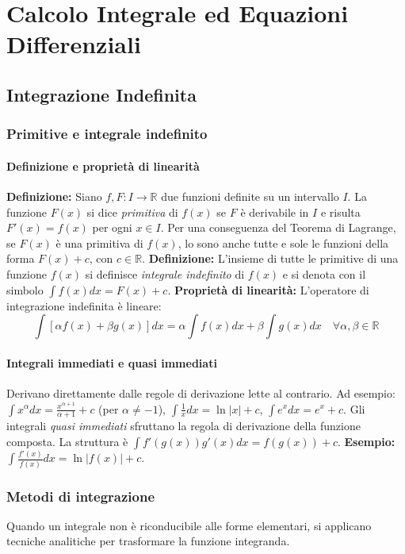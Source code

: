 \chapter{Calcolo Integrale ed Equazioni Differenziali}

\section{Integrazione Indefinita}
\subsection{Primitive e integrale indefinito}
\subsubsection{Definizione e proprietà di linearità}
\textbf{Definizione:} Siano $f, F: I \to \mathbb{R}$ due funzioni definite su un intervallo $I$. La funzione $F(x)$ si dice \textit{primitiva} di $f(x)$ se $F$ è derivabile in $I$ e risulta $F'(x) = f(x)$ per ogni $x \in I$.
Per una conseguenza del Teorema di Lagrange, se $F(x)$ è una primitiva di $f(x)$, lo sono anche tutte e sole le funzioni della forma $F(x) + c$, con $c \in \mathbb{R}$.
\textbf{Definizione:} L'insieme di tutte le primitive di una funzione $f(x)$ si definisce \textit{integrale indefinito} di $f(x)$ e si denota con il simbolo $\int f(x) dx = F(x) + c$.
\textbf{Proprietà di linearità:} L'operatore di integrazione indefinita è lineare:
\[ \int [\alpha f(x) + \beta g(x)] dx = \alpha \int f(x) dx + \beta \int g(x) dx \quad \forall \alpha, \beta \in \mathbb{R} \]

\subsubsection{Integrali immediati e quasi immediati}
Derivano direttamente dalle regole di derivazione lette al contrario. Ad esempio: $\int x^\alpha dx = \frac{x^{\alpha+1}}{\alpha+1} + c$ (per $\alpha \neq -1$), $\int \frac{1}{x} dx = \ln|x| + c$, $\int e^x dx = e^x + c$.
Gli integrali \textit{quasi immediati} sfruttano la regola di derivazione della funzione composta. La struttura è $\int f'(g(x))g'(x)dx = f(g(x)) + c$. 
\textbf{Esempio:} $\int \frac{f'(x)}{f(x)} dx = \ln|f(x)| + c$.

\subsection{Metodi di integrazione}
Quando un integrale non è riconducibile alle forme elementari, si applicano tecniche analitiche per trasformare la funzione integranda.

